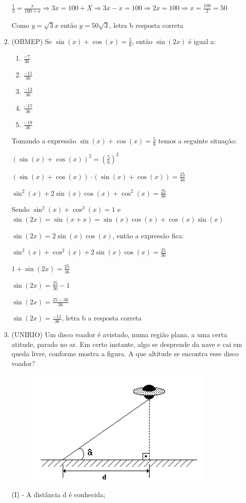 \begin{multicols*}{2}
\begin{enumerate}
    $\frac{1}{3} = \frac{x}{100 +x} \Rightarrow 3x = 100+X \Rightarrow3x - x = 100 \Rightarrow
    2x = 100 \Rightarrow x = \frac{100}{2} = 50$
    
    Como $y = \sqrt{3} x$ então $y = 50 \sqrt{3}$, letra b resposta correta
    
    \item (OBMEP) Se $\sin(x) + \cos(x) = \frac{5}{6}$, então $\sin(2x)$ é igual a:
    \begin{enumerate}
    \item $\frac{-7}{36}$
    \item $\frac{-11}{36}$
    \item $\frac{-13}{36}$
    \item $\frac{-17}{36}$
    \item $\frac{-19}{36}$
    \end{enumerate}
    Tomando a expressão $\sin(x) + \cos(x) = \frac{5}{6}$ temos a seguinte situação:
    
    $(\sin(x) + \cos(x))^2 = \left( \frac{5}{6} \right)^2$
    
    $(\sin(x) + \cos(x))\cdot(\sin(x) + \cos(x)) = \frac{25}{36}$
    
    $\sin^2(x) + 2 \sin(x) \cos(x) + \cos^2(x) = \frac{25}{36}$
    
    Sendo $\sin^2(x) + \cos^2(x) = 1$ e $\sin(2x) = \sin(x+x) = \sin(x) \cos(x) + \cos(x) \sin(x)$
    
    $\sin(2x) = 2 \sin(x) \cos(x)$, então a expressão fica:
    
    $\sin^2(x) +  \cos^2(x) + 2 \sin(x) \cos(x) = \frac{25}{36}$
    
    $1 + \sin(2x) = \frac{25}{36}$
    
    $\sin(2x) = \frac{25}{36} - 1$
    
    $\sin(2x) = \frac{25 - 36}{36}$
    
    $\sin(2x) = \frac{-11}{36}$, letra b a resposta correta
    
    \item (UNIRIO) Um disco voador é avistado, numa região plana, a uma certa atitude, parado no ar. Em certo instante, algo se desprende da nave e cai em queda livre, conforme mostra a figura. A que altitude se encontra esse disco voador?
    \begin{figure}[H]
        \includegraphics[scale=0.45]{assets/rafael/img40.png}
    \end{figure}
    (I) - A distância d é conhecida;
    

\end{enumerate}
\end{multicols*}
